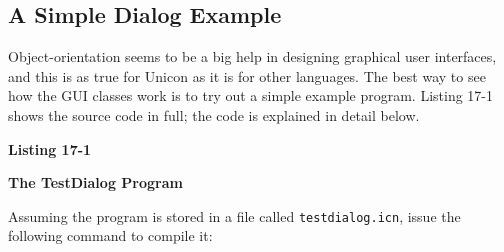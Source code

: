 \subsection[A Simple Dialog Example]{A Simple Dialog Example}
Object-orientation seems to be a big help in designing
graphical user interfaces, and this is as true for Unicon as it is for
other languages. The best way to see how the GUI classes work is to try
out a simple example program. Listing 17-1 shows the source code in
full; the code is explained in detail below.

{\sffamily\bfseries
Listing 17-1}

{\sffamily\bfseries
The TestDialog Program}



\noindent Assuming the program is stored in a file called
\texttt{testdialog.icn},
issue the following command to compile it:

